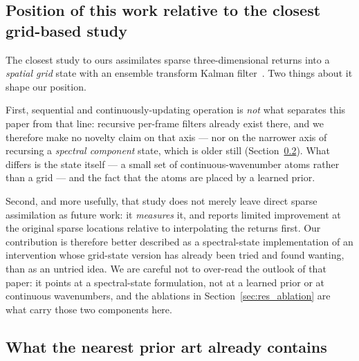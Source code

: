 \documentclass[review]{elsarticle}
\begin{document}
\subsection{Position of this work relative to the closest grid-based study}
\label{sec:rel_wang}

The closest study to ours assimilates sparse three-dimensional returns into a
\emph{spatial grid} state with an ensemble transform Kalman
filter~\cite{Wang2025PointsToWaves}. Two things about it shape our position.

First, sequential and continuously-updating operation is \emph{not} what separates
this paper from that line: recursive per-frame filters already exist there, and we
therefore make no novelty claim on that axis --- nor on the narrower axis of
recursing a \emph{spectral component} state, which is older still
(Section~\ref{sec:preemption}). What differs is the state itself ---
a small set of continuous-wavenumber atoms rather than a grid --- and the fact that
the atoms are placed by a learned prior.

Second, and more usefully, that study does not merely leave direct sparse
assimilation as future work: it \emph{measures} it, and reports limited improvement
at the original sparse locations relative to interpolating the returns first. Our
contribution is therefore better described as a spectral-state implementation of an
intervention whose grid-state version has already been tried and found wanting, than
as an untried idea. We are careful not to over-read the outlook of that paper: it
points at a spectral-state formulation, not at a learned prior or at continuous
wavenumbers, and the ablations in Section~\ref{sec:res_ablation} are what carry those
two components here.

\subsection{What the nearest prior art already contains}
\label{sec:preemption}
\end{document}
